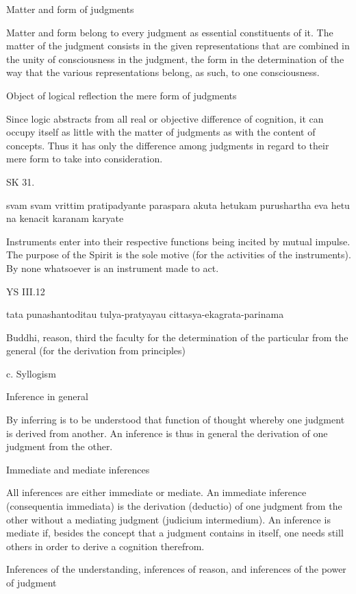     Matter and form of judgments

        Matter and form belong to every judgment as essential constituents of it.
        The matter of the judgment consists in the given representations that are combined in
        the unity of consciousness in the judgment,
        the form in the determination of the way that the various representations belong, as such,
        to one consciousness.

    Object of logical reflection the mere form of judgments

        Since logic abstracts from all real or objective difference of cognition,
        it can occupy itself as little with the matter of judgments as with
        the content of concepts.
        Thus it has only the difference among judgments in regard to their mere form
        to take into consideration.

SK 31.

svam svam vrittim pratipadyante paraspara akuta hetukam
purushartha eva hetu na kenacit karanam karyate

Instruments enter into their respective functions being incited by mutual impulse.
The purpose of the Spirit is the sole motive (for the activities of the instruments).
By none whatsoever is an instrument made to act.

YS III.12

    tata punashantoditau tulya-pratyayau cittasya-ekagrata-parinama

    Buddhi, reason, third the faculty for the determination of
    the particular from the general (for the derivation from principles)

    c. Syllogism

    Inference in general

        By inferring is to be understood that function of thought whereby one judgment is derived from another.
        An inference is thus in general the derivation of one judgment from the other.

    Immediate and mediate inferences

        All inferences are either immediate or mediate.
        An immediate inference (consequentia immediata) is the derivation (deductio) of
        one judgment from the other without a mediating judgment (judicium intermedium).
        An inference is mediate if, besides the concept that a judgment contains in itself,
        one needs still others in order to derive a cognition therefrom.

    Inferences of the understanding, inferences of reason, and inferences of
    the power of judgment

